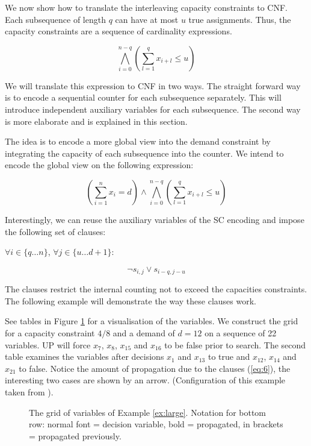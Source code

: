 \documentclass[]{llncs}
\begin{document}
We now show how to translate the interleaving capacity constraints to CNF. Each subsequence of length $q$ can have at
most $u$ true assignments. Thus, the capacity constraints are a sequence of cardinality expressions. 

$$\bigwedge_{i=0}^{n-q}(\sum_{l=1}^q x_{i+l} \leq u )$$

We will translate this expression to CNF in two ways. The straight forward way is to encode a sequential counter for
each subsequence separately. This will introduce independent auxiliary variables for each subsequence. The second way is
more elaborate and is explained in this section.

The idea is to encode a more global view into the demand constraint by integrating the capacity of each subsequence into
the counter. We intend to encode the global view on the following expression: 

$$ (\sum_{i=1}^n x_{i} = d) \wedge \bigwedge_{i=0}^{n-q}(\sum_{l=1}^q x_{i+l} \leq u )$$

Interestingly, we can reuse the auxiliary variables of the SC encoding and impose the following set of clauses: 

$\forall {i \in \{q \ldots n\}}$, $\forall {j\in\{u\ldots d+1\}}$: 

\begin{equation} \label{eq:6}
    \neg s_{i,j} \vee s_{i-q,j-u}
\end{equation}               

The clauses restrict the internal counting not to exceed the capacities constraints. The following example will demonstrate
the way these clauses work. 

\begin{example}
\label{ex:large} See tables in Figure \ref{fig3} for a visualisation of the variables. We construct the grid for a
capacity constraint $4/8$ and a demand of $d=12$ on a sequence of 22 variables. UP will force $x_{7}$, $x_{8}$, $x_{15}$
and $x_{16}$ to be false prior to search. The second table examines the variables after decisions $x_{1}$ and $x_{13}$ to
true and $x_{12}$, $x_{14}$ and $x_{21}$ to false. Notice the amount of propagation due to the clauses (\ref{eq:6}), the
interesting two cases are shown by an arrow. (Configuration of this example taken from  \cite{Siala12}). 
\end{example}

\begin{figure}
\centering 
\caption{The grid of variables of Example \ref{ex:large}. Notation for bottom row: normal font = decision variable, bold
= propagated, in brackets = propagated previously.}
%
%
\label{fig3}
\end{figure}
\end{document}
